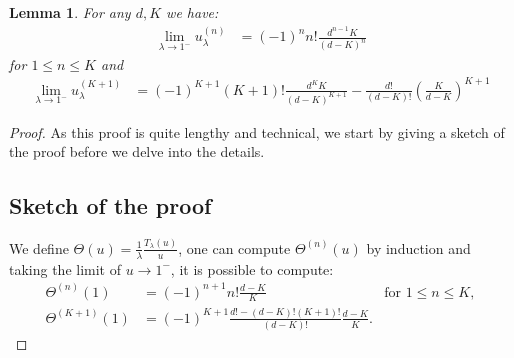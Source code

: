 \documentclass[12pt]{report}
\newtheorem{lemma}[theorem]{Lemma}
\begin{document}
\begin{lemma}\label{lem:Dulamn}
For any $d,K$ we have:
\begin{align}\label{eq:Dulam_lowerK}
\lim_{\lambda \rightarrow 1^-} u_\lambda^{(n)} &= (-1)^n n! \frac{d^{n-1} K }{(d-K)^n}
\end{align}
for $1 \leq n \leq K $ and 
\begin{align}
\lim_{\lambda \rightarrow 1^-} u_{\lambda}^{(K+1)} &= (-1)^{K+1} (K+1)! \frac{d^K K}{(d-K)^{K+1}}
- \frac{d!}{(d-K)!} \left( \frac{K}{d-K} \right)^{K+1}\label{eq:Dulam_Kplus1}
\end{align}
\end{lemma}
\begin{proof}
As this proof is quite lengthy and technical, we start by giving a sketch of the proof before we delve into the details.
\subsection*{Sketch of the proof}
We define $\Theta(u)=\frac{1}{\lambda}\frac{T_\lambda(u)}{u}$, one can compute $\Theta^{(n)}(u)$ by induction and taking the limit of $u \rightarrow 1^-$, it is possible to compute:
\begin{align}
\Theta^{(n)}(1) &= (-1)^{n+1} n! \frac{d-K}{K} & \mbox{for } 1 \leq n \leq K ,  \label{eq:Dtheta_lowerK_paper}\\
\Theta^{(K+1)}(1) &= (-1)^{K+1} \frac{d! - (d-K)! (K+1)!}{(d-K)!} \frac{d-K}{K}. \label{eq:Dtheta_Kplus1_paper}
\end{align}


\end{proof}
\end{document}
